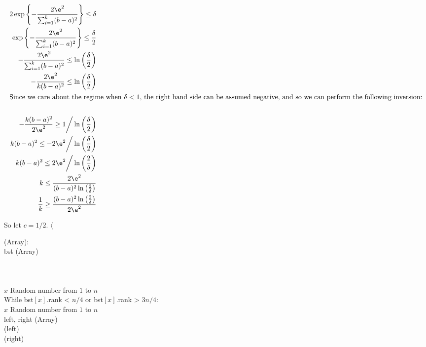 \documentclass[../main.tex]{subfiles}
\begin{document}
\begin{align*}
2\exp\left\{ -\frac{2 \e^2}{\sum_{i=1}^{k}(b-a)^2}  \right\} \leq \delta  \\
\exp\left\{ -\frac{2 \e^2}{\sum_{i=1}^{k}(b-a)^2}  \right\} \leq \frac{\delta}{2} \\
 -\frac{2 \e^2}{\sum_{i=1}^{k}(b-a)^2} \leq \ln \left(\frac{\delta}{2}\right) \\
 -\frac{2 \e^2}{k(b-a)^2} \leq \ln \left(\frac{\delta}{2}\right) \\
 \intertext{Since we care about the regime when $\delta < 1$, the right hand side can be assumed negative, and so we can perform the following inversion:} \\
 -\frac{k(b-a)^2}{2 \e^2} \geq 1 \bigg/ \ln \left(\frac{\delta}{2}\right) \\
 k(b-a)^2 \leq -2 \e^2 \bigg/ \ln \left(\frac{\delta}{2}\right) \\
 k(b-a)^2 \leq 2 \e^2 \bigg/ \ln \left(\frac{2}{\delta}\right) \\
 k \leq \frac{2 \e^2}{(b-a)^2 \ln \left(\frac{2}{\delta}\right)} \\
 \frac{1}{k} \geq \frac{(b-a)^2 \ln \left(\frac{2}{\delta}\right)}{2 \e^2} \\
\end{align*}

So let $c = 1/2$. $\langle$


\begin{algo}
    (Array): \+\\
    bst \leftarrow {}(Array) \\
     \\
     \\
     \\
    $x$ \leftarrow Random number from $1$ to $n$ \\
    While bst$[x]$.rank < $n/4$ or bst$[x]$.rank > $3n/4$: \+\\
    $x$ \leftarrow Random number from $1$ to $n$ \-\\
    left, right \leftarrow {}(Array) \\
    (left) \\
    (right) \\
\end{algo}
\end{document}
